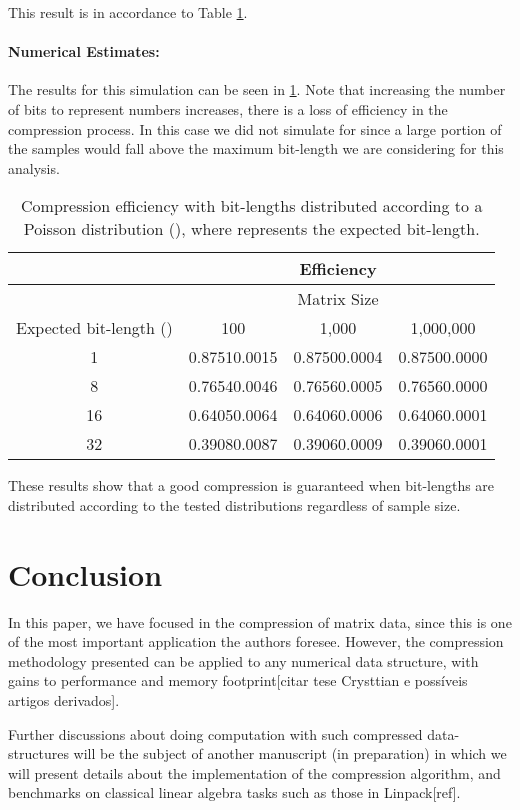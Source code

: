 \documentclass[10pt]{article}
\begin{document}
This result is in accordance to Table \ref{tab:05}.
\paragraph{Numerical Estimates:}
The results for this simulation can be seen in \ref{tab:05}. Note that increasing the number of bits to represent numbers increases, there is a loss of efficiency in the compression process. In this case we did not simulate for  since a large portion of the samples would fall above the maximum bit-length we are considering for this analysis. 

 \begin{table}[h]
   \centering
   \caption{Compression efficiency with bit-lengths distributed according to a Poisson distribution (), where  represents the expected bit-length.}
  \begin{tabular}{cccc}
      \hline
      &&Efficiency       & \\
      \hline
      &&Matrix Size& \\
      Expected bit-length ()	& 100	& 1,000		    & 1,000,000 \\
      \hline
      1 	& 0.87510.0015 	& 0.87500.0004 & 0.87500.0000 \\ 
      8 	& 0.76540.0046 	& 0.76560.0005 & 0.76560.0000 \\ 
      16 	& 0.64050.0064 	& 0.64060.0006 & 0.64060.0001 \\ 
      32 	& 0.39080.0087 	& 0.39060.0009 & 0.39060.0001 \\ 
      \hline
  \end{tabular}
  \label{tab:05}
 \end{table}

These results show that a good compression is guaranteed when bit-lengths are distributed according to the tested distributions regardless of sample size.

\section{Conclusion}
In this paper, we have focused in the compression of matrix data, since this is one of the most important application the authors foresee. However, the compression methodology presented can be applied to any numerical data structure, with gains to performance and memory footprint[citar tese Crysttian e possíveis artigos derivados]. 

Further discussions about doing computation with such compressed data-structures will be the subject of another manuscript (in preparation) in which we will present details about the implementation of the compression algorithm, and benchmarks on classical linear algebra tasks such as those in Linpack[ref].
\end{document}
